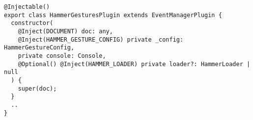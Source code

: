 \begin{verbatim}
@Injectable()
export class HammerGesturesPlugin extends EventManagerPlugin {
  constructor(
    @Inject(DOCUMENT) doc: any,
    @Inject(HAMMER_GESTURE_CONFIG) private _config: HammerGestureConfig,
    private console: Console,
    @Optional() @Inject(HAMMER_LOADER) private loader?: HammerLoader | null
  ) {
    super(doc);
  }
  ..
}
\end{verbatim}
